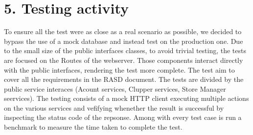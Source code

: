 
\chapter{5. Testing activity}
To ensure all the test were as close as a real scenario as possible, we decided to bypass the use of a mock database and instead test on the production one.
Due to the small size of the public interfaces classes, to avoid trivial testing, the tests are focused on the Routes of the webserver. Those components interact directly with the public interfaces, rendering the test more complete.
The test aim to cover all the requirements in the RASD document. The tests are divided by the public service interaces (Acount services, Clupper services, Store Manager seervices). The testing consists of a mock HTTP client executing multiple actions on the various services and vefifying whenether the result is successful by inspecting the status code of the repsonse.
Among with every test case is run a benchmark to measure the time taken to complete the test.

